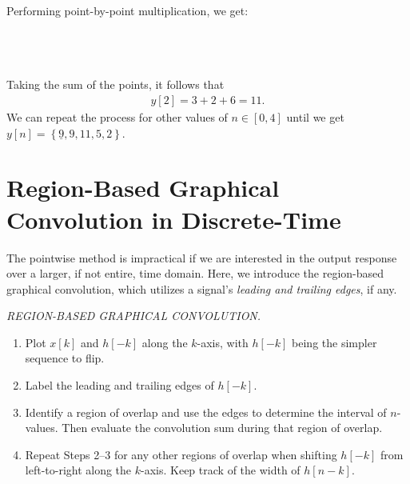 \documentclass{report}
\begin{document}
\begin{solution}
    Performing point-by-point multiplication, we get: \\ \\
    \\ \\
    Taking the sum of the points, it follows that 
    \begin{align*}
        y[2] = 3 + 2 + 6 = 11.
    \end{align*}
    We can repeat the process for other values of $n\in[0,4]$ until we get $y[n]=\left\{\underline{9},9,11,5,2\right\}$.
\end{solution}

\section{Region-Based Graphical Convolution in Discrete-Time}
The pointwise method is impractical if we are interested in the output response over a larger, if not entire, time domain. Here, we introduce the region-based 
graphical convolution, which utilizes a signal's \emph{leading and trailing edges}, if any. 

\begin{tcolorbox}[width=\textwidth,colback={white}, sharp corners]
    \noindent\emph{REGION-BASED GRAPHICAL CONVOLUTION.}
    \begin{enumerate}[Step 1:]
        \item Plot $x[k]$ and $h[-k]$ along the $k$-axis, with $h[-k]$ being the simpler sequence to flip.
        \item Label the leading and trailing edges of $h[-k]$.
        \item Identify a region of overlap and use the edges to determine the interval of $n$-values. Then evaluate the convolution sum during that region of overlap. 
        \item Repeat Steps 2--3 for any other regions of overlap when shifting $h[-k]$ from left-to-right along the $k$-axis. Keep track of the width of $h[n-k]$. 
    \end{enumerate}
\end{tcolorbox}
\end{document}
